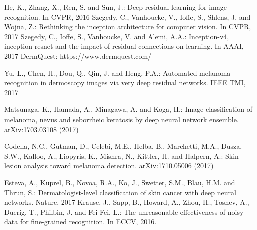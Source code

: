 \documentclass{llncs}
\begin{document}
\begin{thebibliography}{50}
%

He, K., Zhang, X., Ren, S. and Sun, J.:
Deep residual learning for image recognition. In CVPR, 2016
Szegedy, C., Vanhoucke, V., Ioffe, S., Shlens, J. and Wojna, Z.:
Rethinking the inception architecture for computer vision. In CVPR, 2017
Szegedy, C., Ioffe, S., Vanhoucke, V. and Alemi, A.A.:
Inception-v4, inception-resnet and the impact of residual connections on learning. In AAAI, 2017
DermQuest: https://www.dermquest.com/

Yu, L., Chen, H., Dou, Q., Qin, J. and Heng, P.A.:
Automated melanoma recognition in dermoscopy images via very deep residual networks. IEEE TMI, 2017


Matsunaga, K., Hamada, A., Minagawa, A. and Koga, H.:
Image classification of melanoma, nevus and seborrheic keratosis by deep neural network ensemble. arXiv:1703.03108 (2017)

Codella, N.C., Gutman, D., Celebi, M.E., Helba, B., Marchetti, M.A., Dusza, S.W., Kalloo, A., Liopyris, K., Mishra, N., Kittler, H. and Halpern, A.:
Skin lesion analysis toward melanoma detection. arXiv:1710.05006 (2017)

Esteva, A., Kuprel, B., Novoa, R.A., Ko, J., Swetter, S.M., Blau, H.M. and Thrun, S.:
Dermatologist-level classification of skin cancer with deep neural networks. Nature, 2017
Krause, J., Sapp, B., Howard, A., Zhou, H., Toshev, A., Duerig, T., Philbin, J. and Fei-Fei, L.:
The unreasonable effectiveness of noisy data for fine-grained recognition. In ECCV, 2016.


\end{thebibliography}
\end{document}
